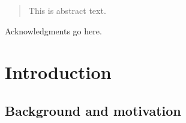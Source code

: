 \uomtoc


\begin{abstract} %
  This is abstract text. 
  
  \lipsum[1-2]
\end{abstract}%
\clearpage



\begin{uomoriginality}
  \uomoriginalitydeclaration 
\end{uomoriginality}
\uomcopyrightstatement



\begin{uomacknowledgements}
Acknowledgments go here.
\end{uomacknowledgements}



\uomstartmainbody %



\section{Introduction} %
  
  \lipsum[1-5] %

  \subsection{Background and motivation}
  \lipsum[1-2]
  
